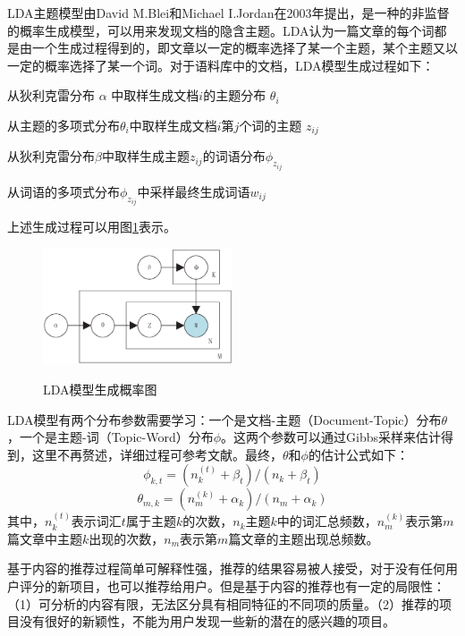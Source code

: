 \documentclass[master,winfonts]{njuthesis}
\begin{document}
LDA主题模型由David M.Blei和Michael I.Jordan在2003年提出，是一种的非监督的概率生成模型，可以用来发现文档的隐含主题。LDA认为一篇文章的每个词都是由一个生成过程得到的，即文章以一定的概率选择了某一个主题，某个主题又以一定的概率选择了某一个词。对于语料库中的文档，LDA模型生成过程如下：
\begin{arabicenum}
\item 从狄利克雷分布 $\alpha$ 中取样生成文档$i$的主题分布 $\theta_{i}$
\item 从主题的多项式分布$\theta_{i}$中取样生成文档$i$第$j$个词的主题 $z_{ij}$
\item 从狄利克雷分布$\beta$中取样生成主题$z_{{ij}}$的词语分布$\phi_{z_{ij}}$
\item 从词语的多项式分布$\phi_{z_{ij}}$中采样最终生成词语$w_{ij}$
\end{arabicenum}
上述生成过程可以用图\ref{fig:11}表示。
\begin{figure}[htbp]
  \centering
  \includegraphics[width=0.5\textwidth]{LDA.eps}\\
  \caption{LDA模型生成概率图}\label{fig:11}
\end{figure}

LDA模型有两个分布参数需要学习：一个是文档-主题（Document-Topic）分布$\theta$，一个是主题-词（Topic-Word）分布$\phi$。这两个参数可以通过Gibbs采样来估计得到，这里不再赘述，详细过程可参考文献\cite{Heinrich2008Parameter}。最终，$\theta$和$\phi$的估计公式如下：
\begin{equation}
\phi _{{k,t}}=(n_{k}^{{(t)}}+\beta _{t})/(n_{k}+\beta _{t})
\end{equation}
\begin{equation}
\theta _{{m,k}}=(n_{m}^{{(k)}}+\alpha _{k})/(n_{m}+\alpha _{k})
\end{equation}
其中，$n_{k}^{{(t)}}$表示词汇$t$属于主题$k$的次数，$n_{k}$主题$k$中的词汇总频数，$n_{m}^{{(k)}}$表示第$m$篇文章中主题$k$出现的次数，$n_{m}$表示第$m$篇文章的主题出现总频数。

基于内容的推荐过程简单可解释性强，推荐的结果容易被人接受，对于没有任何用户评分的新项目，也可以推荐给用户。但是基于内容的推荐也有一定的局限性：（1）可分析的内容有限，无法区分具有相同特征的不同项的质量。（2）推荐的项目没有很好的新颖性，不能为用户发现一些新的潜在的感兴趣的项目。
\end{document}

